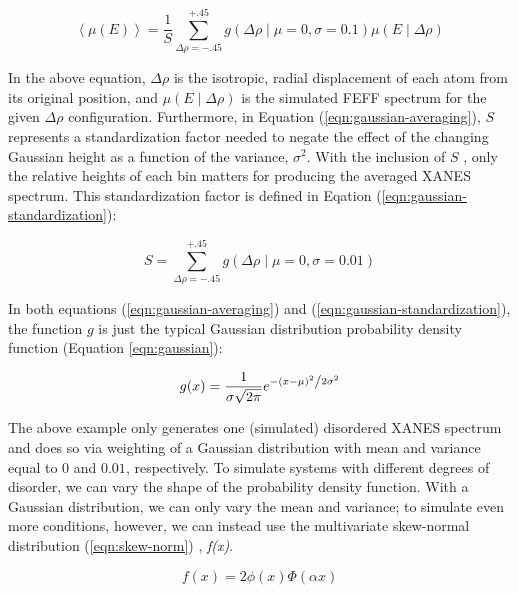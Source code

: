 \begin{equation}
	\label{eqn:gaussian-averaging}
	\left\langle \mu(E) \right\rangle  = \frac{1}{S} \sum_{\Delta\rho=-.45}^{+.45} g\left(\Delta \rho \mid \mu=0, \sigma=0.1\right) \mu(E \mid \Delta\rho)
\end{equation}

\noindent
In the above equation, $ \Delta\rho $ is the isotropic, radial displacement of each atom from its original position, and $ \mu(E \mid \Delta\rho) $ is the simulated FEFF spectrum for the given $ \Delta\rho $ configuration. Furthermore, in Equation (\ref{eqn:gaussian-averaging}), $ S $ represents a standardization factor needed to negate the effect of the changing Gaussian height as a function of the variance, $ \sigma^2 $. With the inclusion of $ S $ , only the relative heights of each bin matters for producing the averaged XANES spectrum. This standardization factor is defined in Eqation (\ref{eqn:gaussian-standardization}):

\begin{equation}
	\label{eqn:gaussian-standardization}
	S = \sum_{\Delta\rho=-.45}^{+.45} g\left(\Delta \rho \mid \mu=0, \sigma=0.01\right)
\end{equation}

\noindent
In both equations (\ref{eqn:gaussian-averaging}) and (\ref{eqn:gaussian-standardization}), the function $ g $ is just the typical Gaussian distribution probability density function (Equation \ref{eqn:gaussian}): 

\begin{equation}
	\label{eqn:gaussian}
	g(x) = \frac{1}{{\sigma \sqrt {2\pi } }}e^{{{ - \left( {x - \mu } \right)^2 } \mathord{\left/ {\vphantom {{ - \left( {x - \mu } \right)^2 } {2\sigma ^2 }}} \right. \kern-\nulldelimiterspace} {2\sigma ^2 }}}
\end{equation}

The above example only generates one (simulated) disordered XANES spectrum and does so via weighting of a Gaussian distribution with mean and variance equal to $ 0 $ and $ 0.01 $, respectively. To simulate systems with different degrees of disorder, we can vary the shape of the probability density function. With a Gaussian distribution, we can only vary the mean and variance; to simulate even more conditions, however, we can instead use the multivariate skew-normal distribution (\ref{eqn:skew-norm}) \cite{skewnorm_Azzalini_1999, 2020SciPy-NMeth}, \textit{f(x)}.

\begin{equation}
	\label{eqn:skew-norm}
	f(x)=2\phi (x)\Phi (\alpha x)
\end{equation}
 
